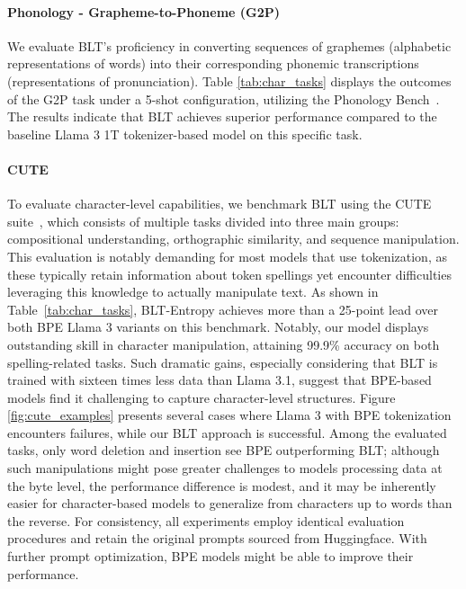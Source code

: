 \paragraph{Phonology - Grapheme-to-Phoneme (G2P)} We evaluate {\textsc BLT}'s proficiency in converting sequences of graphemes (alphabetic representations of words) into their corresponding phonemic transcriptions (representations of pronunciation). Table \ref{tab:char_tasks} displays the outcomes of the G2P task under a 5-shot configuration, utilizing the Phonology Bench~\citep{suvarna2024phonologybench}. The results indicate that {\textsc BLT} achieves superior performance compared to the baseline Llama 3 1T tokenizer-based model on this specific task.

\paragraph{CUTE}
To evaluate character-level capabilities, we benchmark {\textsc BLT} using the CUTE suite~\citep{edman2024cute}, which consists of multiple tasks divided into three main groups: compositional understanding, orthographic similarity, and sequence manipulation. This evaluation is notably demanding for most models that use tokenization, as these typically retain information about token spellings yet encounter difficulties leveraging this knowledge to actually manipulate text. As shown in Table~\ref{tab:char_tasks}, {\textsc BLT}-Entropy achieves more than a 25-point lead over both BPE Llama 3 variants on this benchmark. Notably, our model displays outstanding skill in character manipulation, attaining 99.9\% accuracy on both spelling-related tasks. Such dramatic gains, especially considering that {\textsc BLT} is trained with sixteen times less data than Llama 3.1, suggest that BPE-based models find it challenging to capture character-level structures. Figure \ref{fig:cute_examples} presents several cases where Llama 3 with BPE tokenization encounters failures, while our {\textsc BLT} approach is successful. Among the evaluated tasks, only word deletion and insertion see BPE outperforming BLT; although such manipulations might pose greater challenges to models processing data at the byte level, the performance difference is modest, and it may be inherently easier for character-based models to generalize from characters up to words than the reverse. For consistency, all experiments employ identical evaluation procedures and retain the original prompts sourced from Huggingface. With further prompt optimization, BPE models might be able to improve their performance.

